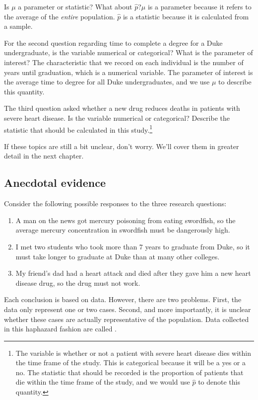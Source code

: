 
\begin{example}{Is $\mu$ a parameter or statistic? What about $\hat{p}$?}$\mu$ is a parameter because it refers to the average of the \emph{entire} population. $\hat{p}$ is a statistic because it is calculated from a sample.
\end{example}

\begin{example}{For the second question regarding time to complete a degree for a Duke undergraduate, is the variable numerical or categorical? What is the parameter of interest?}
The characteristic that we record on each individual is the number of years until graduation, which is a numerical variable. The parameter of interest is the average time to degree for all Duke undergraduates, and we use $\mu$ to describe this quantity.
\end{example}

\begin{exercise}The third question asked whether a new drug reduces deaths in patients with severe heart disease. Is the variable numerical or categorical? Describe the statistic that should be calculated in this study.\footnote{The variable is whether or not a patient with severe heart disease dies within the time frame of the study. This is categorical because it will be a yes or a no. The statistic that should be recorded is the proportion of patients that die within the time frame of the study, and we would use $\hat{p}$ to denote this quantity.}
\end{exercise}

If these topics are still a bit unclear, don't worry. We'll cover them in greater detail in the next chapter.


\subsection{Anecdotal evidence}
\label{anecdotalEvidenceSubsection}

Consider the following possible responses to the three research questions:
\begin{enumerate}
\item A man on the news got mercury poisoning from eating swordfish, so the average mercury concentration in swordfish must be dangerously high.
\item\label{iKnowThreeStudentsWhoTookMoreThan7YearsToGraduateAtDuke} I met two students who took more than 7 years to graduate from Duke, so it must take longer to graduate at Duke than at many other colleges.
\item\label{myFriendsDadDiedAfterSulphinpyrazon} My friend's dad had a heart attack and died after they gave him a new heart disease drug, so the drug must not work.
\end{enumerate}
Each conclusion is based on data. However, there are two problems. First, the data only represent one or two cases. Second, and more importantly, it is unclear whether these cases are actually representative of the population. Data collected in this haphazard fashion are called .

